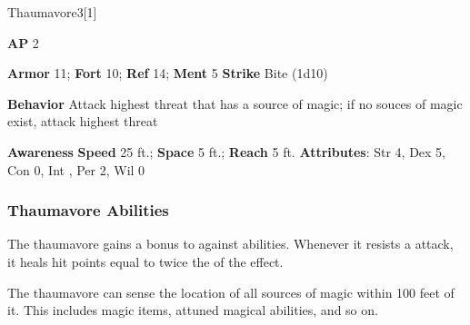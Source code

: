 \begin{monsection}{Thaumavore}{3}[1]
\vspace{-1em}\vspace{-1em}
\begin{spellcontent}
\begin{spelltargetinginfo}
{\textbf{AP} 2}

\pari \textbf{Armor} 11;
\textbf{Fort} 10;
\textbf{Ref} 14;
\textbf{Ment} 5
\pari \textbf{Strike} Bite  (1d10)



\pari \textbf{Behavior} Attack highest threat that has a source of magic; if no souces of magic exist, attack highest threat
\end{spelltargetinginfo}
\end{spellcontent}

\begin{monsterfooter}
\pari \textbf{Awareness} 
\pari \textbf{Speed} 25 ft.;
\textbf{Space} 5 ft.;
\textbf{Reach} 5 ft.
\pari \textbf{Attributes}:
Str 4,
Dex 5,
Con 0,
Int ,
Per 2,
Wil 0
\end{monsterfooter}
\end{monsection}


\subsubsection{Thaumavore Abilities}

The thaumavore gains a  bonus to  against  abilities.
Whenever it resists a  attack, it heals hit points equal to twice the  of the effect.

\vspace{0.5em}
The thaumavore can sense the location of all sources of magic within 100 feet of it.
This includes magic items, attuned magical abilities, and so on.


